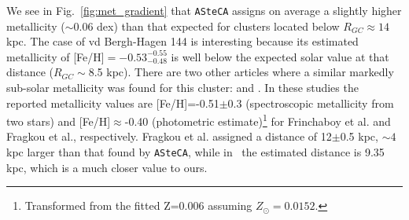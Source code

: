 \documentclass{aa}
\begin{document}
  We see in Fig.~\ref{fig:met_gradient} that \texttt{ASteCA} assigns on
  average a slightly higher metallicity ($\sim$0.06 dex) than that
  expected for clusters located below $R_{GC}\approx14$ kpc.
  The case of vd Bergh-Hagen 144 is interesting because its estimated
  metallicity of [Fe/H]$=-0.53_{-0.48}^{-0.55}$ is well below the expected
  solar value at that distance ($R_{GC}\sim$8.5 kpc). There are two other
  articles where a similar markedly sub-solar metallicity was found
  for this cluster: \cite{Frinchaboy_2004} and \cite{Fragkou_2019}. In these
  studies the reported metallicity values are [Fe/H]=-0.51$\pm$0.3 
  (spectroscopic metallicity from two stars) and [Fe/H]$\approx$-0.40 (photometric
  estimate)\footnote{Transformed from the fitted Z=0.006 assuming
  $Z_{\odot}=0.0152$.} for Frinchaboy et al. and Fragkou et al., respectively.
  Fragkou et al. assigned a distance of 12$\pm$0.5 kpc, $\sim4$ kpc
  larger than that found by \texttt{ASteCA}, while in~\cite{Frinchaboy_2004b}
  the estimated distance is 9.35 kpc, which is a much closer value to ours.
\end{document}
